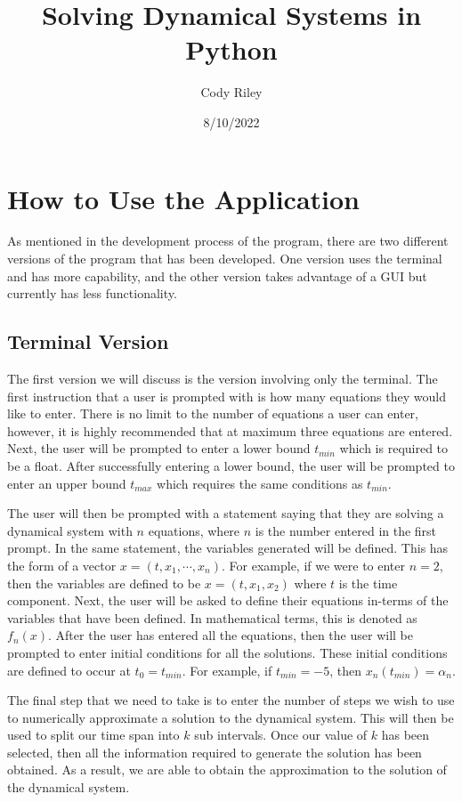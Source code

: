 \documentclass[12pt]{report}
\title{Solving Dynamical Systems in Python}
\author{Cody Riley}
\date{8/10/2022}
\begin{document}
\maketitle
\newpage
\chapter{How to Use the Application}
As mentioned in the development process of the program, there are two different versions of the program that has been developed. One version uses the terminal and has more capability, and the other version takes advantage of a GUI but currently has less functionality.
\smallskip
\section*{Terminal Version}
The first version we will discuss is the version involving only the terminal. The first instruction that a user is prompted with is how many equations they would like to enter. There is no limit to the number of equations a user can enter, however, it is highly recommended that at maximum three equations are entered. Next, the user will be prompted to enter a lower bound $t_{min}$ which is required to be a float. After successfully entering a lower bound, the user will be prompted to enter an upper bound $t_{max}$ which requires the same conditions as $t_{min}$.
\smallskip

The user will then be prompted with a statement saying that they are solving a dynamical system with $n$ equations, where $n$ is the number entered in the first prompt. In the same statement, the variables generated will be defined. This has the form of a vector $x = (t,x_{1},\cdots, x_{n})$. For example, if we were to enter $n = 2$, then the variables are defined to be $x = (t,x_{1},x_{2})$ where $t$ is the time component. Next, the user will be asked to define their equations in-terms of the variables that have been defined. In mathematical terms, this is denoted as $f_{n}(x)$. After the user has entered all the equations, then the user will be prompted to enter initial conditions for all the solutions. These initial conditions are defined to occur at $t_{0} = t_{min}$. For example, if $t_{min} = -5$, then $x_{n}\left(t_{min}\right) = \alpha_{n}$.
\smallskip

The final step that we need to take is to enter the number of steps we wish to use to numerically approximate a solution to the dynamical system. This will then be used to split our time span into $k$ sub intervals. Once our value of $k$ has been selected, then all the information required to generate the solution has been obtained. As a result, we are able to obtain the approximation to the solution of the dynamical system.
\end{document}
